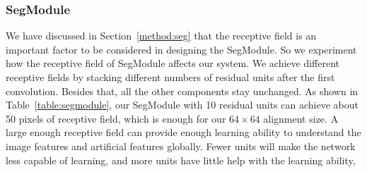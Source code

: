\documentclass[10pt,twocolumn,letterpaper]{article}
\begin{document}
\subsubsection{SegModule}
\label{sec:SegModule}
We have discussed in Section~\ref{method:seg} that the receptive field is an important factor to be considered in designing the SegModule. So we experiment how the receptive field of SegModule affects our system. 
We achieve different receptive fields by stacking different numbers of residual units after the first convolution.
Besides that, all the other components stay unchanged. As shown in Table~\ref{table:segmodule}, our SegModule with 10 residual units can achieve about 50 pixels of receptive field, which is enough for our $64\times64$ alignment size. A large enough receptive field can provide enough learning ability to understand the image features and artificial features globally. Fewer units will make the network less capable of learning, and more units have little help with the learning ability,
\end{document}
